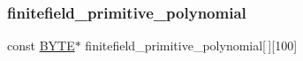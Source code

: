 \subsubsection{\texorpdfstring{finitefield\+\_\+primitive\+\_\+polynomial}{finitefield\_primitive\_polynomial}}
{\footnotesize\ttfamily const \mbox{\hyperlink{galois_8h_ab6cc7b4aeb6ea31aba2b3fbfc83ff5e6}{B\+Y\+TE}}$\ast$ finitefield\+\_\+primitive\+\_\+polynomial\mbox{[}$\,$\mbox{]}\mbox{[}100\mbox{]}}

